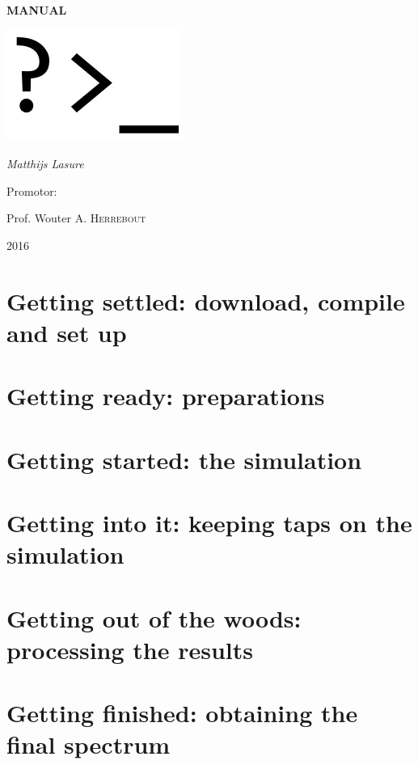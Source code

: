 \documentclass[a4paper,fleqn]{report}
\begin{document}
	
	\pagestyle{MyStyle}
	
	\begin{titlepage}
		\centering
		\vspace{0.5cm}

		{\huge\bfseries MANUAL\par}
		\vspace{0.5cm}
		\includegraphics[width=0.5\linewidth]{images/prompt.png}
		\vfill
		
		{\Large\itshape Matthijs Lasure\par}
		\vspace{0.5cm}
		Promotor:\par
		Prof. Wouter A. \textsc{Herrebout}
		
		\vfill
		
		{\large 2016\par}
		
	\end{titlepage}
	
	\tableofcontents
	
	\chapter{Getting settled: download, compile and set up}
	
	\chapter{Getting ready: preparations}
	
	\chapter{Getting started: the simulation}
	
	\chapter{Getting into it: keeping taps on the simulation}
	
	\chapter{Getting out of the woods: processing the results}
	
	\chapter{Getting finished: obtaining the final spectrum}
	
\end{document}
